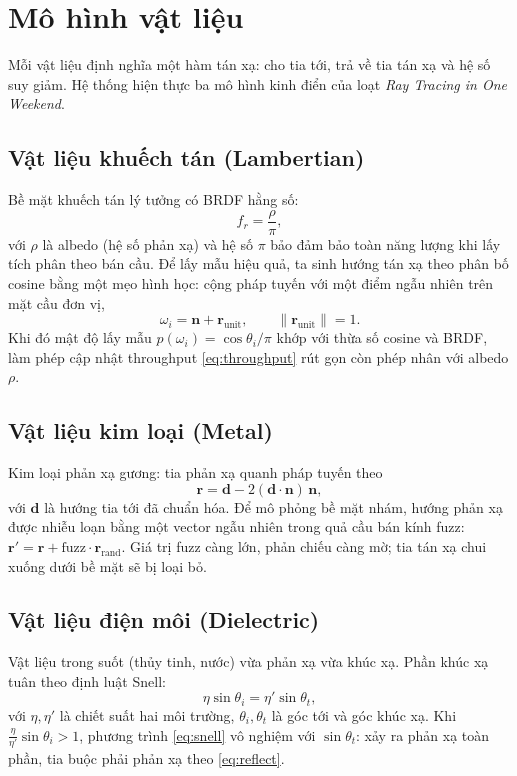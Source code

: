 \section{Mô hình vật liệu}
\label{sec:vatlieu}
Mỗi vật liệu định nghĩa một hàm tán xạ: cho tia tới, trả về tia tán xạ và
hệ số suy giảm. Hệ thống hiện thực ba mô hình kinh điển của loạt
\emph{Ray Tracing in One Weekend}.

\subsection{Vật liệu khuếch tán (Lambertian)}
Bề mặt khuếch tán lý tưởng có BRDF hằng số:
\begin{equation}
f_r = \frac{\rho}{\pi},
\end{equation}
với $\rho$ là albedo (hệ số phản xạ) và hệ số $\pi$ bảo đảm bảo toàn năng lượng
khi lấy tích phân theo bán cầu. Để lấy mẫu hiệu quả, ta sinh hướng tán xạ theo
phân bố cosine bằng một mẹo hình học: cộng pháp tuyến với một điểm ngẫu
nhiên trên mặt cầu đơn vị,
\begin{equation}
\omega_i = \mathbf{n} + \mathbf{r}_{\text{unit}}, \qquad
\|\mathbf{r}_{\text{unit}}\| = 1 .
\end{equation}
Khi đó mật độ lấy mẫu $p(\omega_i)=\cos\theta_i/\pi$ khớp với thừa số cosine và
BRDF, làm phép cập nhật throughput \eqref{eq:throughput} rút gọn còn phép nhân
với albedo $\rho$.

\subsection{Vật liệu kim loại (Metal)}
Kim loại phản xạ gương: tia phản xạ quanh pháp tuyến theo
\begin{equation}
\label{eq:reflect}
\mathbf{r} = \mathbf{d} - 2(\mathbf{d}\cdot\mathbf{n})\,\mathbf{n},
\end{equation}
với $\mathbf{d}$ là hướng tia tới đã chuẩn hóa. Để mô phỏng bề mặt nhám, hướng
phản xạ được nhiễu loạn bằng một vector ngẫu nhiên trong quả cầu bán kính
fuzz: $\mathbf{r}' = \mathbf{r} + \text{fuzz}\cdot\mathbf{r}_{\text{rand}}$.
Giá trị fuzz càng lớn, phản chiếu càng mờ; tia tán xạ chui xuống dưới bề mặt sẽ
bị loại bỏ.

\subsection{Vật liệu điện môi (Dielectric)}
Vật liệu trong suốt (thủy tinh, nước) vừa phản xạ vừa khúc xạ. Phần khúc xạ tuân
theo định luật Snell:
\begin{equation}
\label{eq:snell}
\eta \sin\theta_i = \eta' \sin\theta_t,
\end{equation}
với $\eta,\eta'$ là chiết suất hai môi trường, $\theta_i,\theta_t$ là góc tới và
góc khúc xạ. Khi $\frac{\eta}{\eta'}\sin\theta_i > 1$, phương trình
\eqref{eq:snell} vô nghiệm với $\sin\theta_t$: xảy ra phản xạ toàn phần,
tia buộc phải phản xạ theo \eqref{eq:reflect}.

